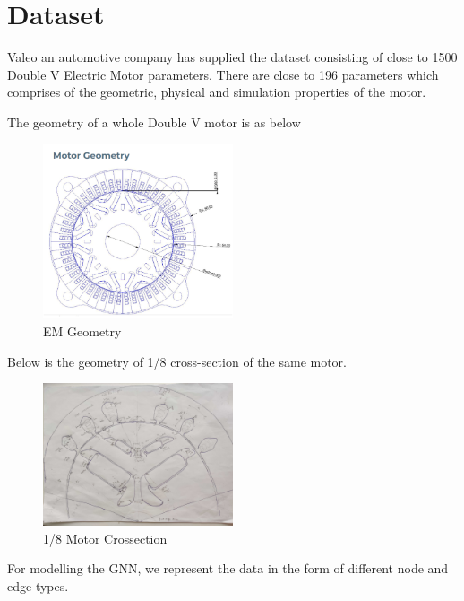 \documentclass[a4paper,12pt]{article}
\begin{document}
\newpage 

\section*{Dataset} 

Valeo an automotive company has supplied the dataset consisting of close to 1500 Double V Electric Motor parameters. 
There are close to 196 parameters which comprises of the geometric, physical and simulation properties of the motor.

The geometry of a whole Double V motor is as below

\begin{figure}[h]
    \centering
    \includegraphics[width=0.5\textwidth]{./ReportImages/FullMotor.png} 
    \caption{EM Geometry}
    \label{fig:Full Motor}
\end{figure}

Below is the geometry of 1/8 cross-section of the same motor.

\begin{figure}[h]
    \centering
    \includegraphics[width=0.5\textwidth]{./ReportImages/EMCrosssection.jpg} 
    \caption{1/8 Motor Crossection}
    \label{fig:1/8 Motor Crossection}
\end{figure}

\newpage 

For modelling the GNN, we represent the data in the form of different node and edge types.\\
\end{document}
